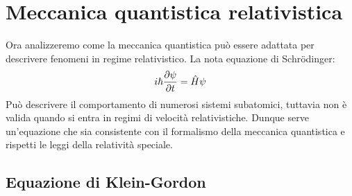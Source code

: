 \chapter{Meccanica quantistica relativistica}
Ora analizzeremo come la meccanica quantistica può essere adattata per descrivere fenomeni in regime relativistico. La nota equazione di Schrödinger:
\begin{equation}
    i \hbar \pdv{\psi}{t}  = \hat{H} \psi
\end{equation}
Può descrivere il comportamento di numerosi sistemi subatomici, tuttavia non è valida quando si entra in regimi di velocità relativistiche. Dunque serve un'equazione che sia consistente con il formalismo della meccanica quantistica e rispetti le leggi della relatività speciale.
\section{Equazione di Klein-Gordon}


